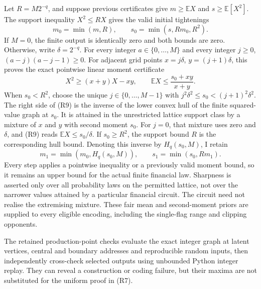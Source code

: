 Let \(R=M2^{-q}\), and suppose previous certificates give
\(m\geq\mathbb E X\) and \(s\geq\mathbb E[X^2]\).
The support inequality \(X^2\leq RX\) gives the valid initial
tightenings
\[
 m_0=\min(m,R),\qquad s_0=\min(s,Rm_0,R^2).                \tag{R8}
\]
If \(M=0\), the finite output is identically zero and both bounds are
zero. Otherwise, write \(\delta=2^{-q}\). For every integer
\(a\in\{0,\ldots,M\}\) and every integer \(j\geq0\),
\((a-j)(a-j-1)\geq0\). For adjacent grid points
\(x=j\delta\), \(y=(j+1)\delta\), this proves the exact pointwise
linear moment certificate
\[
 X^2\geq(x+y)X-xy,
 \qquad \mathbb E X\leq\frac{s_0+xy}{x+y}.                \tag{R9}
\]
When \(s_0<R^2\), choose the unique \(j\in\{0,\ldots,M-1\}\)
with \(j^2\delta^2\leq s_0<(j+1)^2\delta^2\). The right side
of (R9) is the inverse of the lower convex hull of the finite squared-value
graph at \(s_0\). It is attained in the unrestricted lattice support
class by a mixture of \(x\) and \(y\) with second moment \(s_0\).
For \(j=0\), that mixture uses zero and \(\delta\), and (R9) reads
\(\mathbb E X\leq s_0/\delta\). If \(s_0\geq R^2\), the support
bound \(R\) is the corresponding hull bound. Denoting this inverse by
\(H_q(s_0,M)\), I retain
\[
 m_1=\min(m_0,H_q(s_0,M)),\qquad
 s_1=\min(s_0,Rm_1).                                      \tag{R10}
\]
Every step applies a pointwise inequality or a previously valid moment
bound, so it remains an upper bound for the actual finite financial law.
Sharpness is asserted only over all probability laws on the permitted
lattice, not over the narrower values attained by a particular financial
circuit. The circuit need not realise the extremising mixture. These
fair mean and second-moment priors are supplied to every eligible encoding,
including the single-flag range and clipping opponents.

The retained production-point checks evaluate the exact integer graph at
latent vertices, central and boundary addresses and reproducible random
inputs, then independently cross-check selected outputs using unbounded
Python integer replay. They can reveal a construction or coding failure,
but their maxima are not substituted for the uniform proof in (R7).
